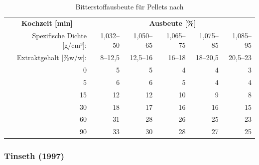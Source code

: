 \documentclass[a4paper,parskip=half]{scrartcl}
\begin{document}
\begin{table}[H]
\centering
\begin{tabular}{rrrrrr} 
\toprule
\multicolumn{1}{c}{\textbf{Kochzeit [min]}} & \multicolumn{5}{c}{\textbf{Ausbeute [\%]}}                                 \\
Spezifische Dichte [g/cm³]:                    & 1,032–50 & 1,050–65 & 1,065–75 & 1,075–85 & 1,085–95  \\
Extraktgehalt [\%w/w]:                    & 8–12,5 & 12,5–16 & 16–18 & 18–20,5 & 20,5–23  \\
\midrule
0                                            & 5        & 5        & 4                            & 4                            & 3                             \\
5                                            & 6        & 6        & 5                            & 4                            & 4                             \\
15                                           & 12       & 12       & 10                           & 9                            & 8                             \\
30                                           & 18       & 17       & 16                           & 16                           & 15                            \\
60                                           & 31       & 28       & 26                           & 25                           & 23                            \\
90                                           & 33       & 30       & 28                           & 27                           & 25                     \\
\bottomrule
\end{tabular}
\caption{Bitterstoffausbeute für Pellets nach \citeauthor{Noonan1996} \parencite[215]{Noonan1996}}
\label{table:noonanbaktpellets}
\end{table}

\subsubsection*{Tinseth (1997)}
\end{document}
